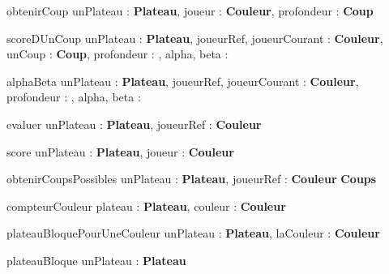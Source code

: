 
\begin{algorithme}
	\signaturefonction
	{obtenirCoup}
	{unPlateau : \textbf{Plateau}, joueur : \textbf{Couleur}, profondeur : \naturel}
	{\textbf{Coup}}
	
	\vspace{5mm}
	
	
	\signaturefonction
	{scoreDUnCoup}
	{unPlateau : \textbf{Plateau}, joueurRef, joueurCourant : \textbf{Couleur}, unCoup : \textbf{Coup}, profondeur : \naturel, alpha, beta : \entier}
	{\entier}
	
	\vspace{5mm}
	
	
	\signaturefonction
	{alphaBeta}
	{unPlateau : \textbf{Plateau}, joueurRef, joueurCourant : \textbf{Couleur}, profondeur : \naturel, alpha, beta : \entier}
	{\entier}
	
	\vspace{5mm}
	
	
	\signaturefonction
	{evaluer}
	{unPlateau : \textbf{Plateau}, joueurRef : \textbf{Couleur}}
	{\entier}
	
	\vspace{5mm}
	
	
	\signaturefonction
	{score}
	{unPlateau : \textbf{Plateau}, joueur : \textbf{Couleur}}
	{\entier}
	
	\vspace{5mm}
	
	
	\signaturefonction
	{obtenirCoupsPossibles}
	{unPlateau : \textbf{Plateau}, joueurRef : \textbf{Couleur}}
	{\textbf{Coups}}
	
	\vspace{5mm}
	
	\signaturefonction
	{compteurCouleur}
	{plateau : \textbf{Plateau}, couleur : \textbf{Couleur}}
	{\naturel}
	
	
	\vspace{5mm}
	
	\signaturefonction
	{plateauBloquePourUneCouleur}
	{unPlateau : \textbf{Plateau}, laCouleur : \textbf{Couleur}}
	{\booleen}
	
	\vspace{5mm}
	
	\signaturefonction
	{plateauBloque}
	{unPlateau : \textbf{Plateau}}
	{\booleen}
	
	
\end{algorithme}

